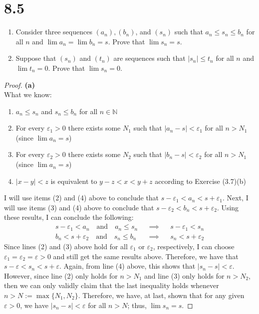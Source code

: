 \documentclass[10pt,a4paper]{article}
\theoremstyle{definition}
\begin{document}
\section*{8.5}
\begin{enumerate}[label = (\alph*)]
\item Consider three sequences $(a_n), (b_n)$, and $(s_n)$ such that $a_n \leq s_n \leq b_n$ for all $n$ and $\lim a_n = \lim b_n = s$. Prove that $\lim s_n = s$. 
\item Suppose that $(s_n)$ and $(t_n)$ are sequences such that $|s_n| \leq t_n$ for all $n$ and $\lim t_n = 0$. Prove that $\lim s_n = 0$.
\end{enumerate}

\begin{proof}{\textbf{(a)}}
\\What we know:
\begin{enumerate}[label = (\arabic*)]
\item $a_n \leq s_n$ and $s_n \leq b_n$ for all $n \in \mathbb{N}$
\item For every $\varepsilon_1 > 0$ there exists some $N_1$ such that $|a_n - s| < \varepsilon_1$ for all $n > N_1$ (since $\lim a_n = s$)
\item For every $\varepsilon_2 > 0$ there exists some $N_2$ such that $|b_n - s| < \varepsilon_2$ for all $n > N_1$ (since $\lim a_n = s$)
\item $|x - y| < z$ is equivalent to $y - z < x < y + z$ according to Exercise (3.7)(b)
\end{enumerate}
I will use items (2) and (4) above to conclude that $s - \varepsilon_1 < a_n < s + \varepsilon_1$. Next, I will use items (3) and (4) above to conclude that $s - \varepsilon_2 < b_n < s + \varepsilon_2$. Using these results, I can conclude the following:
\begin{align*}
s - \varepsilon_1 < a_n \quad \text{and} \quad a_n \leq s_n && \implies && s - \varepsilon_1 < s_n\\
b_n < s + \varepsilon_2 \quad \text{and} \quad s_n \leq b_n && \implies && s_n < s + \varepsilon_2
\end{align*}
Since lines (2) and (3) above hold for all $\varepsilon_1$ or $\varepsilon_2$, respectively, I can choose $\varepsilon_1 = \varepsilon_2 = \varepsilon > 0$ and still get the same results above. Therefore, we have that $s - \varepsilon < s_n < s + \varepsilon$. Again, from line (4) above, this shows that $|s_n - s| < \varepsilon$. However, since line (2) only holds for $n > N_1$ and line (3) only holds for $n > N_2$, then we can only validly claim that the last inequality holds whenever $n > N := \max\{N_1, N_2\}$. Therefore, we have, at last, shown that for any given $\varepsilon > 0$, we have $|s_n - s| < \varepsilon$ for all $n > N$; thus, $\lim s_n = s$.
\end{proof}
\end{document}
